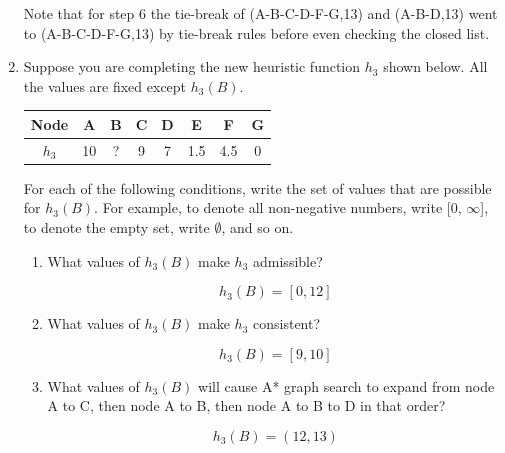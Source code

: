 \documentclass[11pt]{article}
\begin{document}
\begin{enumerate}
    Note that for step 6 the tie-break of (A-B-C-D-F-G,13) and (A-B-D,13) went to (A-B-C-D-F-G,13) by tie-break rules before even checking the closed list.

  \item Suppose you are completing the new heuristic function $h_3$
    shown below.  All the values are fixed except $h_3(B)$.

\begin{center}
\begin{tabular}{|c|c|c|c|c|c|c|c|}
\hline
Node & A & B & C & D & E & F & G \\
\hline
$h_3$& 10 & ?  & 9 & 7 & 1.5 & 4.5& 0 \\
\hline
\end{tabular}
\end{center}

For each of the following conditions, write the set of values that are
possible for $h_3(B)$.  For example, to denote all non-negative
numbers, write [0, $\infty$], to denote the empty set, write
$\emptyset$, and so on.

\begin{enumerate}

\item What values of $h_3(B)$ make $h_3$ admissible?

\[
h_3(B) = [0, 12]
\]

\item What values of $h_3(B)$ make $h_3$ consistent?

\[
h_3(B) = [9, 10]
\]

\item What values of $h_3(B)$ will cause A* graph search to expand
  from node A to C, then node A to B, then node A to B to D in that
  order?

\[
h_3(B) = (12, 13)
\]

\end{enumerate}

\end{enumerate}
\end{document}
